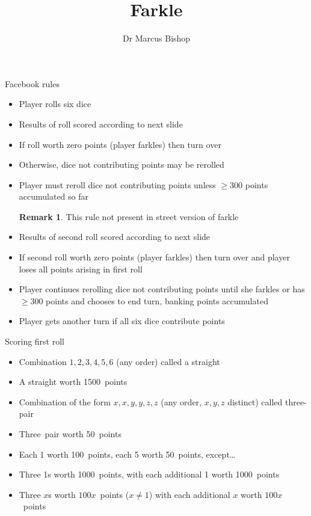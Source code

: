 \documentclass[handout]{beamer}
\title[Farkle]{Farkle}
\author{Dr Marcus Bishop}
\theoremstyle{definition}
\newtheorem{remark}{Remark}
\begin{document}
\begin{frame}\titlepage\end{frame}
\LogoOff

\begin{frame}{Facebook rules}
\begin{itemize}
\item Player rolls six dice
\item Results of roll scored according to next slide
\item If roll worth zero points (player \alert{farkles})
then turn over
\item Otherwise, dice not contributing points \alert{may}
be rerolled
\item Player \alert{must} reroll dice not contributing
points unless $\ge 300$ points accumulated so far
\begin{remark}
This rule not present in street version of farkle
\end{remark}
\item Results of second roll scored according to next slide
\item If second roll worth zero points
(player \alert{farkles}) then turn over and
player loses all points arising in first roll
\item Player continues rerolling dice not contributing
points until she farkles or has $\ge 300$ points and
chooses to end turn, banking points accumulated
\item Player gets another turn if all six
dice contribute points
\end{itemize}
\end{frame}

\begin{frame}{Scoring first roll}
\begin{itemize}
\item Combination $1,2,3,4,5,6$
(any order) called a \alert{straight}
\item A straight worth 1500~points
\item Combination of the form $x,x,y,y,z,z$
(any order, $x,y,z$ distinct) called \alert{three-pair}
\item Three~pair worth 50~points
\item Each 1 worth 100~points, each 5 worth 50~points,
except\dots
\item Three 1s worth 1000~points, with each additional
1 worth 1000~points
\item Three $x$s worth $100x$~points ($x\ne 1$)
with each additional $x$ worth $100x$~points
\end{itemize}
\end{frame}
\end{document}
